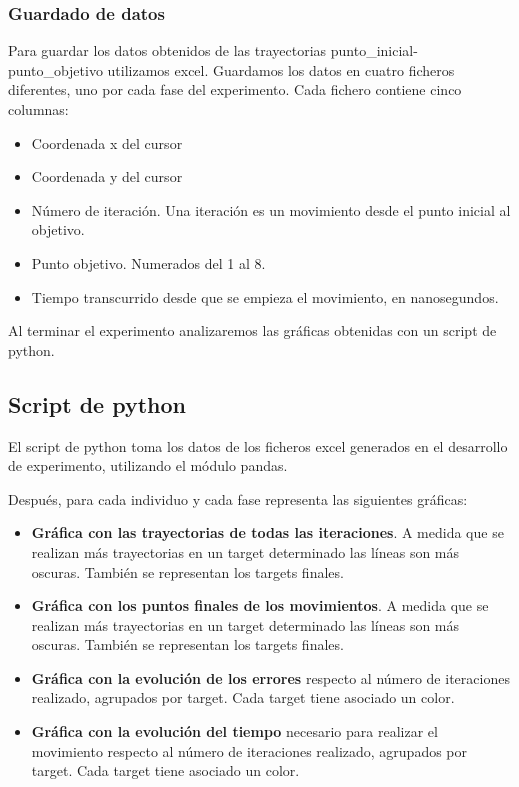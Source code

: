 \documentclass[a4paper,11pt, oneside]{book}
\begin{document}
\subsubsection{Guardado de datos}

Para guardar los datos obtenidos de las trayectorias punto\_inicial-punto\_objetivo utilizamos excel. Guardamos los datos en cuatro ficheros diferentes, uno por cada fase del experimento. Cada fichero contiene cinco columnas:
\begin{itemize}
	\item Coordenada x del cursor
	\item Coordenada y del cursor
	\item Número de iteración. Una iteración es un movimiento desde el punto inicial al objetivo.
	\item Punto objetivo. Numerados del 1 al 8.
	\item Tiempo transcurrido desde que se empieza el movimiento, en nanosegundos.
\end{itemize}

Al terminar el experimento analizaremos las gráficas obtenidas con un script de python.

\subsection{Script de python}

El script de python toma los datos de los ficheros excel generados en el desarrollo de experimento, utilizando el módulo pandas.

Después, para cada individuo y cada fase representa las siguientes gráficas:

\begin{itemize}
	\item \textbf{Gráfica con las trayectorias de todas las iteraciones}. A medida que se realizan más trayectorias en un target determinado las líneas son más oscuras. También se representan los targets finales.
	\item \textbf{Gráfica con los puntos finales de los movimientos}. A medida que se realizan más trayectorias en un target determinado las líneas son más oscuras. También se representan los targets finales.
	\item \textbf{Gráfica con la evolución de los errores} respecto al número de iteraciones realizado, agrupados por target. Cada target tiene asociado un color.
	\item \textbf{Gráfica con la evolución del tiempo} necesario para realizar el movimiento respecto al número de iteraciones realizado, agrupados por target. Cada target tiene asociado un color.
\end{itemize}
\end{document}

